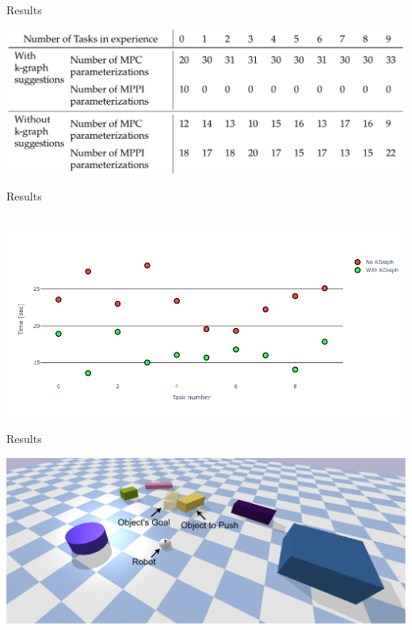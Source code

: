 \begin{frame}[fragile]{Results} 
\begin{center}
\includegraphics[width=1.0\textwidth]{figures/results/random_drive_para}
\end{center}
\end{frame}

\begin{frame}[fragile]{Results} 
\begin{center}
  \hbox{\hspace{-0.7cm} \includegraphics[width=1.1\textwidth]{figures/results/random_drive_time_vs}}
\end{center}
\end{frame}

\begin{frame}[fragile]{Results} 
\begin{center}
   \includegraphics[width=1.0\textwidth]{figures/results/random_1.drawio}
\end{center}
\end{frame}


